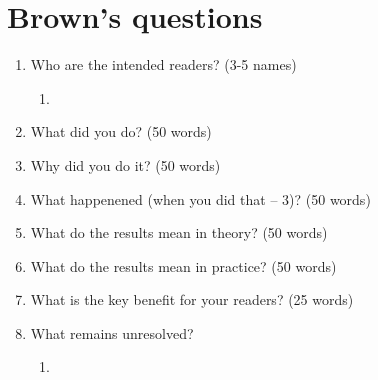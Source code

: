 \documentclass[%
reprint,
amsmath,amssymb,
aps,
]{revtex4-1}
\begin{document}
\maketitle

\section{\label{sec:brownsq}Brown's questions}

\begin{enumerate}
	
	\item Who are the intended readers? (3-5 names)
	\begin{enumerate}
	
		\item
	
	\end{enumerate}
	
	\item What did you do? (50 words) \\
	
	
	\item Why did you do it? (50 words) \\

	
	\item What happenened (when you did that – 3)? (50 words) \\ 
	

	\item What do the results mean in theory? (50 words) \\
	

	\item What do the results mean in practice? (50 words) \\
	
	
	\item What is the key benefit for your readers? (25 words) \\
	
	
	\item What remains unresolved? \\
	\begin{enumerate}
		\item
	
	\end{enumerate}		 		 
	
\end{enumerate}
 
\end{document}

